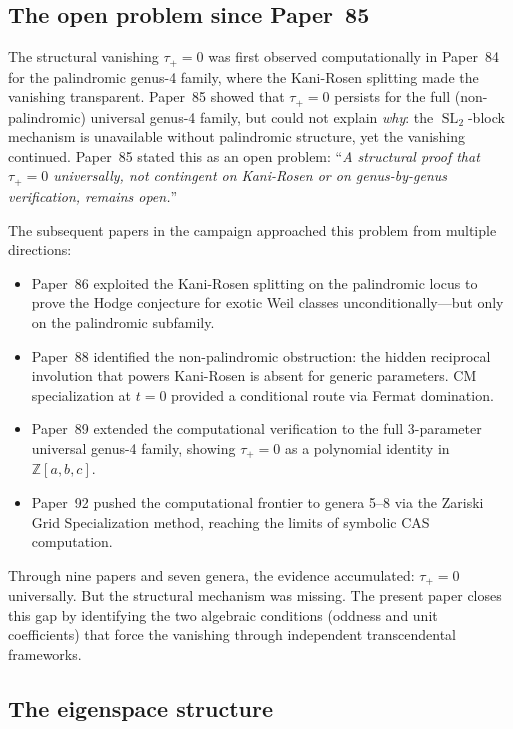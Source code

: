 \documentclass[11pt]{article}
\theoremstyle{plain}
\theoremstyle{definition}
\theoremstyle{remark}
\newcommand{\ZZ}{\mathbb{Z}}
\newcommand{\SL}{\operatorname{SL}}
\begin{document}
\subsection{The open problem since Paper~85}\label{subsec:open-since-p85}

The structural vanishing $\tau_+ = 0$ was first observed computationally in
Paper~84 \cite{p84} for the palindromic genus-4 family, where the Kani-Rosen
splitting made the vanishing transparent.  Paper~85 \cite{p85} showed that
$\tau_+ = 0$ persists for the full (non-palindromic) universal genus-4 family,
but could not explain \emph{why}: the $\SL_2$-block mechanism is unavailable
without palindromic structure, yet the vanishing continued.  Paper~85 stated
this as an open problem: ``\emph{A structural proof that $\tau_+ = 0$ universally,
not contingent on Kani-Rosen or on genus-by-genus verification, remains open.}''

The subsequent papers in the campaign approached this problem from multiple
directions:
\begin{itemize}
  \item Paper~86 \cite{p86} exploited the Kani-Rosen splitting on the
    palindromic locus to prove the Hodge conjecture for exotic Weil classes
    unconditionally---but only on the palindromic subfamily.
  \item Paper~88 identified the non-palindromic obstruction: the hidden
    reciprocal involution that powers Kani-Rosen is absent for generic
    parameters.  CM specialization at $t = 0$ provided a conditional route
    via Fermat domination.
  \item Paper~89 extended the computational verification to the full
    3-parameter universal genus-4 family, showing $\tau_+ = 0$ as a
    polynomial identity in $\ZZ[a,b,c]$.
  \item Paper~92 pushed the computational frontier to genera 5--8 via
    the Zariski Grid Specialization method, reaching the limits of
    symbolic CAS computation.
\end{itemize}
Through nine papers and seven genera, the evidence accumulated: $\tau_+ = 0$
universally.  But the structural mechanism was missing.  The present paper
closes this gap by identifying the two algebraic conditions (oddness and unit
coefficients) that force the vanishing through independent transcendental
frameworks.

\subsection{The eigenspace structure}
\end{document}
